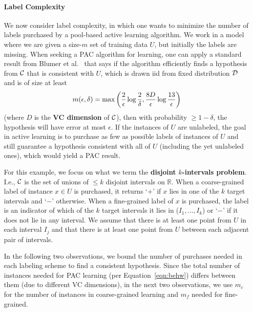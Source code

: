 \paragraph{Label Complexity}
We now consider label complexity, in which one wants to minimize the 
number of labels purchased by a pool-based active learning algorithm.
We work in a model where we are given a size-$m$ set of training data $U$,
but initially the labels are missing. When seeking a PAC algorithm for learning, one
can apply a standard result from Blumer et al.~\cite{behw-lvd-89} that says if
the algorithm efficiently finds a hypothesis from $\cal C$ that is
consistent with $U$, which is
drawn iid from fixed distribution $\cal D$ and is of size at least
\begin{equation}
m(\epsilon,\delta) = \max \left( {2 \over \epsilon} \log {2 \over \delta}, {8D \over \epsilon} \log {13
\over \epsilon}  \right)
\label{eqn:behw}
\end{equation}
(where $D$ is the {\bf VC dimension} of ${\cal C}$),
then with probability $ \ge 1-\delta$, the hypothesis will have error
at most $\epsilon$.  If the instances of $U$ are 
unlabeled, the goal in active learning is to purchase as few as possible
labels of
instances of $U$ and still guarantee a hypothesis consistent with
all of $U$ (including the yet unlabeled ones), which would yield a PAC result. 

For this example, we focus on what we term the {\bf disjoint $k$-intervals
problem}.
I.e., $\cal C$ is the set of unions of 
$ \le k$ disjoint intervals on $\mathbb{R}$. When a coarse-grained label
of instance $x \in U$ is purchased, it returns
`$+$' if $x$ lies in one of the $k$ target intervals and `$-$' otherwise.
When a fine-grained label of $x$ is purchased, the label is an indicator
of which of the $k$ target intervals it lies in ($I_1,\ldots,I_k$) or `$-$' if
it does not lie in any interval.  We assume that there is
at least one point from $U$ in each interval $I_j$ and that there is
at least  one point from $U$ between each adjacent pair of intervals.

In the following two observations, we 
bound the number of purchases needed in each labeling scheme to find a consistent
hypothesis.  Since the total number of instances needed for PAC learning
(per Equation~\ref{eqn:behw}) differs between them (due to different VC
dimensions), in the next two observations, we use $m_c$ for the 
number of instances in coarse-grained learning and $m_f$ needed
for fine-grained.

